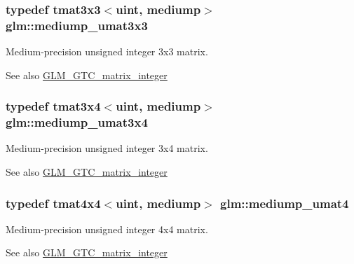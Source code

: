 \subsubsection[{mediump\+\_\+umat3x3}]{\setlength{\rightskip}{0pt plus 5cm}typedef tmat3x3$<${\bf uint}, mediump$>$ {\bf glm\+::mediump\+\_\+umat3x3}}\label{group__gtc__matrix__integer_gaa55f7815a399a780907a1dcd4caef7d9}
Medium-\/precision unsigned integer 3x3 matrix. \begin{DoxySeeAlso}{See also}
\hyperlink{group__gtc__matrix__integer}{G\+L\+M\+\_\+\+G\+T\+C\+\_\+matrix\+\_\+integer} 
\end{DoxySeeAlso}
\hypertarget{group__gtc__matrix__integer_ga21a2361cc10822ad1a2297ac286c8e26}{}
\subsubsection[{mediump\+\_\+umat3x4}]{\setlength{\rightskip}{0pt plus 5cm}typedef tmat3x4$<${\bf uint}, mediump$>$ {\bf glm\+::mediump\+\_\+umat3x4}}\label{group__gtc__matrix__integer_ga21a2361cc10822ad1a2297ac286c8e26}
Medium-\/precision unsigned integer 3x4 matrix. \begin{DoxySeeAlso}{See also}
\hyperlink{group__gtc__matrix__integer}{G\+L\+M\+\_\+\+G\+T\+C\+\_\+matrix\+\_\+integer} 
\end{DoxySeeAlso}
\hypertarget{group__gtc__matrix__integer_ga3eb3a5d85ec876ba65fad5525a5dda56}{}
\subsubsection[{mediump\+\_\+umat4}]{\setlength{\rightskip}{0pt plus 5cm}typedef tmat4x4$<${\bf uint}, mediump$>$ {\bf glm\+::mediump\+\_\+umat4}}\label{group__gtc__matrix__integer_ga3eb3a5d85ec876ba65fad5525a5dda56}
Medium-\/precision unsigned integer 4x4 matrix. \begin{DoxySeeAlso}{See also}
\hyperlink{group__gtc__matrix__integer}{G\+L\+M\+\_\+\+G\+T\+C\+\_\+matrix\+\_\+integer} 
\end{DoxySeeAlso}
\hypertarget{group__gtc__matrix__integer_ga9dd5ce011ca43d90cf1b94084c7e90ac}{}
